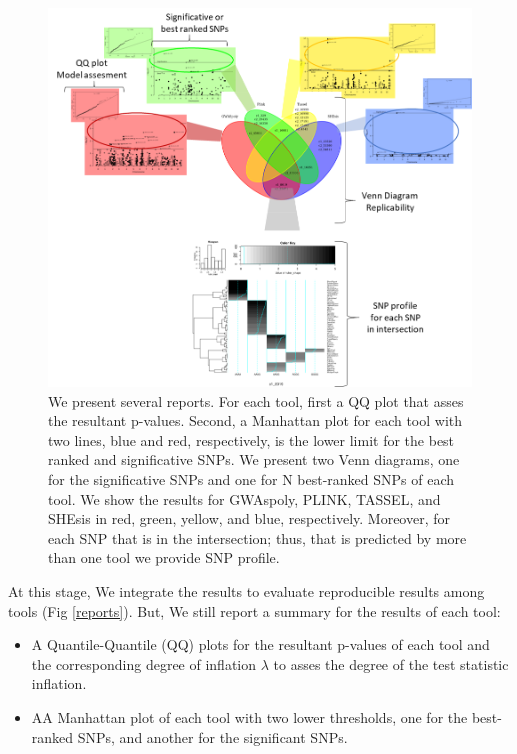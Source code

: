 \begin{figure}

\includegraphics[width=15cm]{images/Reportes_Metodologia.png}
\caption{We present several reports. For each tool, first a QQ plot that asses the resultant p-values.  Second, a Manhattan plot for each tool with two lines, blue and red, respectively, is the lower limit for the best ranked and significative SNPs. We present two Venn diagrams, one for the significative SNPs and one for N best-ranked SNPs of each tool. We show the results for GWAspoly, PLINK, TASSEL, and SHEsis in red, green, yellow, and blue, respectively. Moreover, for each SNP that is in the intersection; thus, that is predicted by more than one tool we provide SNP profile. \label{reports}}
\label{pipeline}
\end{figure}

At this stage, We integrate the results to evaluate reproducible results among tools (Fig \ref{reports}). But, We still report a summary for the results of each tool:
\begin{itemize}
    \item A Quantile-Quantile (QQ) plots for the resultant p-values of each tool and the corresponding degree of inflation $\lambda$ to asses the degree of the test statistic inflation.
    \item AA Manhattan plot of each tool with two lower thresholds, one for the best-ranked SNPs, and another for the significant SNPs. 
\end{itemize}

